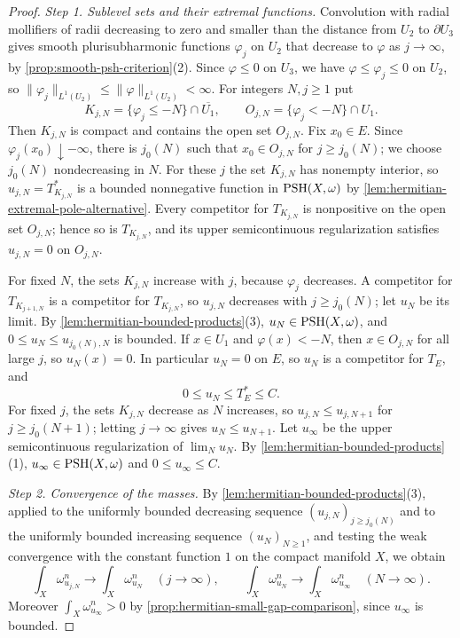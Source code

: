 \begin{proof}
\emph{Step 1. Sublevel sets and their extremal functions.} Convolution with radial mollifiers of radii decreasing to zero and smaller than the distance from $U_2$ to $\partial U_3$ gives smooth plurisubharmonic functions $\varphi_j$ on $U_2$ that decrease to $\varphi$ as $j\to\infty$, by \cref{prop:smooth-psh-criterion}(2). Since $\varphi\leq0$ on $U_3$, we have $\varphi\leq\varphi_j\leq0$ on $U_2$, so $\|\varphi_j\|_{L^1(U_2)}\leq\|\varphi\|_{L^1(U_2)}<\infty$. For integers $N,j\geq1$ put
\[
 K_{j,N}=\{\varphi_j\leq-N\}\cap\overline{U_1},\qquad O_{j,N}=\{\varphi_j<-N\}\cap U_1.
\]
Then $K_{j,N}$ is compact and contains the open set $O_{j,N}$. Fix $x_0\in E$. Since $\varphi_j(x_0)\downarrow-\infty$, there is $j_0(N)$ such that $x_0\in O_{j,N}$ for $j\geq j_0(N)$; we choose $j_0(N)$ nondecreasing in $N$. For these $j$ the set $K_{j,N}$ has nonempty interior, so $u_{j,N}=T_{K_{j,N}}^*$ is a bounded nonnegative function in $\mathrm{PSH}(X,\omega)$ by \cref{lem:hermitian-extremal-pole-alternative}. Every competitor for $T_{K_{j,N}}$ is nonpositive on the open set $O_{j,N}$; hence so is $T_{K_{j,N}}$, and its upper semicontinuous regularization satisfies $u_{j,N}=0$ on $O_{j,N}$.

For fixed $N$, the sets $K_{j,N}$ increase with $j$, because $\varphi_j$ decreases. A competitor for $T_{K_{j+1,N}}$ is a competitor for $T_{K_{j,N}}$, so $u_{j,N}$ decreases with $j\geq j_0(N)$; let $u_N$ be its limit. By \cref{lem:hermitian-bounded-products}(3), $u_N\in\mathrm{PSH}(X,\omega)$, and $0\leq u_N\leq u_{j_0(N),N}$ is bounded. If $x\in U_1$ and $\varphi(x)<-N$, then $x\in O_{j,N}$ for all large $j$, so $u_N(x)=0$. In particular $u_N=0$ on $E$, so $u_N$ is a competitor for $T_E$, and
\[
                    0\leq u_N\leq T_E^*\leq C.
\]
For fixed $j$, the sets $K_{j,N}$ decrease as $N$ increases, so $u_{j,N}\leq u_{j,N+1}$ for $j\geq j_0(N+1)$; letting $j\to\infty$ gives $u_N\leq u_{N+1}$. Let $u_\infty$ be the upper semicontinuous regularization of $\lim_Nu_N$. By \cref{lem:hermitian-bounded-products}(1), $u_\infty\in\mathrm{PSH}(X,\omega)$ and $0\leq u_\infty\leq C$.

\emph{Step 2. Convergence of the masses.} By \cref{lem:hermitian-bounded-products}(3), applied to the uniformly bounded decreasing sequence $(u_{j,N})_{j\geq j_0(N)}$ and to the uniformly bounded increasing sequence $(u_N)_{N\geq1}$, and testing the weak convergence with the constant function $1$ on the compact manifold $X$, we obtain
\[
 \int_X\omega_{u_{j,N}}^n\longrightarrow\int_X\omega_{u_N}^n\quad(j\to\infty),\qquad
 \int_X\omega_{u_N}^n\longrightarrow\int_X\omega_{u_\infty}^n\quad(N\to\infty).
\]
Moreover $\int_X\omega_{u_\infty}^n>0$ by \cref{prop:hermitian-small-gap-comparison}, since $u_\infty$ is bounded.


\end{proof}
